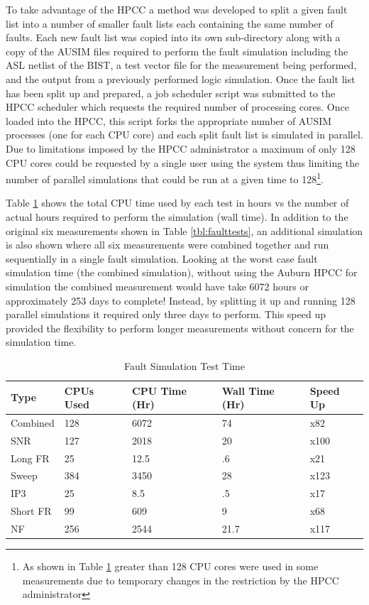 \documentclass[12pt]{report}
\begin{document}
To take advantage of the HPCC a method was developed to split a given fault list into a number of smaller fault lists each containing the same number of faults.  Each new fault list was copied into its own sub-directory along with a copy of the AUSIM files required to perform the fault simulation including the ASL netlist of the BIST, a test vector file for the measurement being performed, and the output from a previously performed logic simulation.  Once the fault list has been split up and prepared, a job scheduler script was submitted to the HPCC scheduler which requests the required number of processing cores.  Once loaded into the HPCC, this script forks the appropriate number of AUSIM processes (one for each CPU core) and each split fault list is simulated in parallel.  Due to limitations imposed by the HPCC administrator a maximum of only 128 CPU cores could be requested by a single user using the system thus limiting the number of parallel simulations that could be run at a given time to 128\footnote{As shown in Table \ref{tbl:faulttesttime} greater than 128 CPU cores were used in some measurements due to temporary changes in the restriction by the HPCC administrator}.  

Table \ref{tbl:faulttesttime} shows the total CPU time used by each test in hours vs the number of actual hours required to perform the simulation (wall time).  In addition to the original six measurements shown in Table \ref{tbl:faulttests}, an additional simulation is also shown where all six measurements were combined together and run sequentially in a single fault simulation.  Looking at the worst case fault simulation time (the combined simulation), without using the Auburn HPCC for simulation the combined measurement would have take 6072 hours or approximately 253 days to complete! Instead, by splitting it up and running 128 parallel simulations it required only three days to perform.  This speed up provided the flexibility to perform longer measurements without concern for the simulation time.
\begin{table}
  \begin{center}
    \caption{Fault Simulation Test Time}
    \begin{tabular}{|l|l|l|l|l|}
      \hline
      Type & CPUs Used & CPU Time (Hr) & Wall Time (Hr) & Speed Up \\ \hline
      Combined & 128 & 6072 & 74 & x82 \\ \hline
      SNR & 127 & 2018 & 20 & x100 \\ \hline
      Long FR & 25 & 12.5 & .6 & x21 \\ \hline
      Sweep & 384 & 3450 & 28 & x123 \\ \hline
      IP3 & 25 & 8.5 & .5 & x17 \\ \hline
      Short FR & 99 & 609 & 9 & x68 \\ \hline
      NF & 256 & 2544 & 21.7 & x117 \\
      \hline
    \end{tabular}
  \label{tbl:faulttesttime}
  \end{center}
\end{table}
\end{document}
